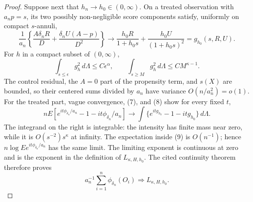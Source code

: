 \documentclass{article}
\begin{document}
\begin{proof}
Suppose next that \(h_n\to h_0\in(0,\infty)\).  On a treated observation with \(a_np=s\), its two possibly non-negligible score components satisfy, uniformly on compact \(s\)-annuli,
\[
 \frac1{a_n}\left\{\frac{A\delta_nR}{D}+\frac{\delta_nU(A-p)}{D^2}\right\}
 \longrightarrow \frac{h_0R}{1+h_0s}+\frac{h_0U}{(1+h_0s)^2}=g_{h_0}(s,R,U). \tag{7}
\]
For \(h\) in a compact subset of \((0,\infty)\),
\[
 \int_{s\leq\epsilon}g_h^2\,d\Lambda\leq C\epsilon^\alpha,
 \qquad
 \int_{s\geq M}g_h^2\,d\Lambda\leq C M^{\kappa-1}. \tag{8}
\]
The control residual, the \(A=0\) part of the propensity term, and \(s(X)\) are bounded, so their centered sums divided by \(a_n\) have variance \(O(n/a_n^2)=o(1)\).  For the treated part, vague convergence, (7), and (8) show for every fixed \(t\),
\[
 nE\!\left[
 e^{it\phi_{\delta_n}/a_n}-1-it\phi_{\delta_n}/a_n
 \right]
 \longrightarrow
 \int\{e^{it g_{h_0}}-1-itg_{h_0}\}\,d\Lambda. \tag{9}
\]
The integrand on the right is integrable: the intensity has finite mass near zero, while it is \(O(s^{-2})s^\kappa\) at infinity.  The expectation inside (9) is \(O(n^{-1})\); hence \(n\log E e^{it\phi_{\delta_n}/a_n}\) has the same limit.  The limiting exponent is continuous at zero and is the exponent in the definition of \(L_{\kappa,H,h_0}\).  The cited continuity theorem therefore proves
\[
 a_n^{-1}\sum_{i=1}^n\phi_{\delta_n}(O_i)\Rightarrow L_{\kappa,H,h_0}. \tag{10}
\]


\end{proof}
\end{document}
